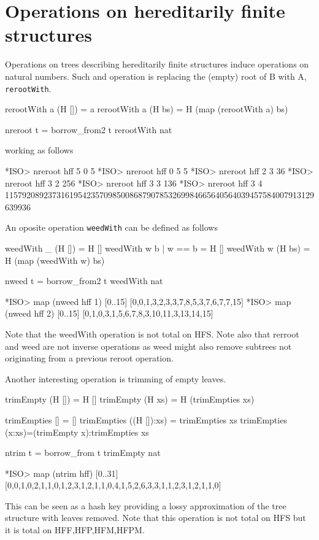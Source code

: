 \documentclass[]{INCLUDES/llncs}
\begin{document}
\section{Operations on hereditarily finite structures}

Operations on trees describing hereditarily finite structures induce operations
on natural numbers. Such and operation is replacing the (empty) root of B with
A, {\tt rerootWith}.

\begin{code}
rerootWith a (H []) = a
rerootWith a (H bs) = H (map (rerootWith a) bs)

nreroot t = borrow_from2 t rerootWith nat
\end{code}
working as follows
\begin{codex}
*ISO> nreroot hff 5 0
5
*ISO> nreroot hff 0 5
5
*ISO> nreroot hff 2 3
36
*ISO> nreroot hff 3 2
256
*ISO> nreroot hff 3 3
136
*ISO> nreroot hff 3 4
115792089237316195423570985008687907853269984665640564039457584007913129639936
\end{codex}
An oposite operation {\tt weedWith} can be defined as follows
\begin{code}
weedWith _ (H []) = H []
weedWith w b | w == b = H [] 
weedWith w (H bs) = H (map (weedWith w) bs)

nweed t = borrow_from2 t weedWith nat
\end{code}
\begin{codex}
*ISO> map (nweed hff 1) [0..15]
[0,0,1,3,2,3,3,7,8,5,3,7,6,7,7,15]
*ISO> map (nweed hff 2) [0..15]
[0,1,0,3,1,5,6,7,8,3,10,11,3,13,14,15]
\end{codex}
Note that the weedWith operation is not total on HFS.
Note also that rerroot and weed are not inverse operations
as weed might also remove subtrees not originating from a previous
reroot operation.

Another interesting operation is trimming of empty leaves.
\begin{code}
trimEmpty (H []) = H []
trimEmpty (H xs) = H (trimEmpties xs)

trimEmpties [] = []
trimEmpties ((H []):xs) = trimEmpties xs
trimEmpties (x:xs)=(trimEmpty x):trimEmpties xs

ntrim t = borrow_from t trimEmpty nat
\end{code}
\begin{codex}
*ISO> map (ntrim hff) [0..31]
[0,0,1,0,2,1,1,0,1,2,3,1,2,1,1,0,4,1,5,2,6,3,3,1,1,2,3,1,2,1,1,0]
\end{codex}
This can be seen as a hash key providing a lossy approximation of the tree
structure with leaves removed. Note that this operation is not total on HFS
but it is total on HFF,HFP,HFM,HFPM.
\end{document}
